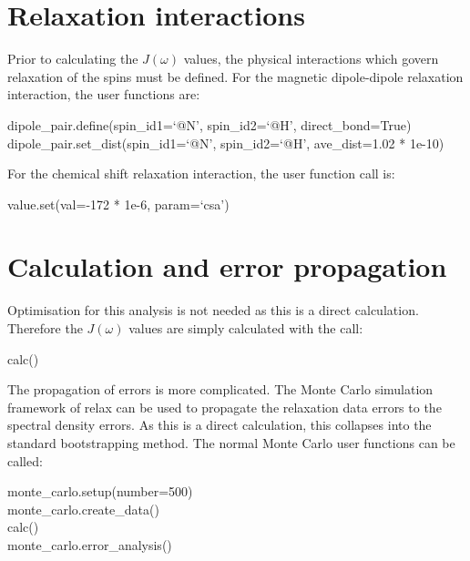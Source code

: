 
\section{Relaxation interactions}

Prior to calculating the $J(\omega)$ values, the physical interactions which govern relaxation of the spins must be defined.  For the magnetic dipole-dipole relaxation interaction, the user functions are:

\begin{exampleenv}
dipole\_pair.define(spin\_id1=`@N', spin\_id2=`@H', direct\_bond=True) \\
dipole\_pair.set\_dist(spin\_id1=`@N', spin\_id2=`@H', ave\_dist=1.02 * 1e-10)
\end{exampleenv}

For the chemical shift relaxation interaction, the user function call is:

\begin{exampleenv}
value.set(val=-172 * 1e-6, param=`csa')
\end{exampleenv}




\section{Calculation and error propagation}

Optimisation for this analysis is not needed as this is a direct calculation.  Therefore the $J(\omega)$ values are simply calculated with the call:

\begin{exampleenv}
calc()
\end{exampleenv}

The propagation of errors is more complicated.  The Monte Carlo simulation framework of relax can be used to propagate the relaxation data errors to the spectral density errors.  As this is a direct calculation, this collapses into the standard bootstrapping method.  The normal Monte Carlo user functions can be called:

\begin{exampleenv}
monte\_carlo.setup(number=500) \\
monte\_carlo.create\_data() \\
calc() \\
monte\_carlo.error\_analysis()
\end{exampleenv}

